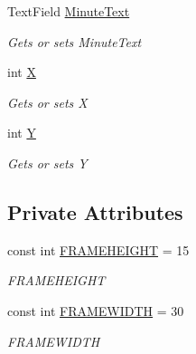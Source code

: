 \begin{DoxyCompactItemize}
Text\+Field \mbox{\hyperlink{class_gtd_app_1_1_console_core_1_1_views_1_1_helpers_1_1_date_input_helper_aaa0a196542464f56b39748266e74e518}{Minute\+Text}}
\begin{DoxyCompactList}\small\item\em Gets or sets Minute\+Text \end{DoxyCompactList}\item 
int \mbox{\hyperlink{class_gtd_app_1_1_console_core_1_1_views_1_1_helpers_1_1_date_input_helper_a723cccccb9dd490790808d5e85fa38af}{X}}
\begin{DoxyCompactList}\small\item\em Gets or sets X \end{DoxyCompactList}\item 
int \mbox{\hyperlink{class_gtd_app_1_1_console_core_1_1_views_1_1_helpers_1_1_date_input_helper_ad2cda8f75e6f9614e39f6f6373c6709b}{Y}}
\begin{DoxyCompactList}\small\item\em Gets or sets Y \end{DoxyCompactList}\end{DoxyCompactItemize}
\subsection*{Private Attributes}
\begin{DoxyCompactItemize}
\item 
const int \mbox{\hyperlink{class_gtd_app_1_1_console_core_1_1_views_1_1_helpers_1_1_date_input_helper_abcb60ee3e40db1fb5fa2fa423341c73e}{F\+R\+A\+M\+E\+H\+E\+I\+G\+HT}} = 15
\begin{DoxyCompactList}\small\item\em F\+R\+A\+M\+E\+H\+E\+I\+G\+HT \end{DoxyCompactList}\item 
const int \mbox{\hyperlink{class_gtd_app_1_1_console_core_1_1_views_1_1_helpers_1_1_date_input_helper_af2be7a496fc1e95f5568b034a7a175d7}{F\+R\+A\+M\+E\+W\+I\+D\+TH}} = 30
\begin{DoxyCompactList}\small\item\em F\+R\+A\+M\+E\+W\+I\+D\+TH \end{DoxyCompactList}\end{DoxyCompactItemize}


